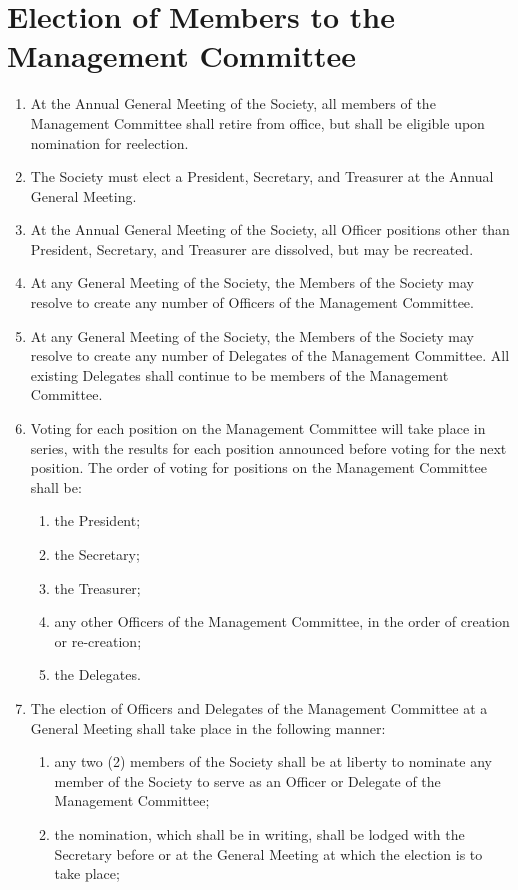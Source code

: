 \documentclass[a4paper]{article}
\begin{document}
\section{Election of Members to the Management Committee}
\begin{enumerate}
\item At the Annual General Meeting of the Society, all members of the Management Committee shall retire from office, but shall be eligible upon nomination for re\textendash election.
\item The Society must elect a President, Secretary, and Treasurer at the Annual General Meeting.
\item At the Annual General Meeting of the Society, all Officer positions other than President, Secretary, and Treasurer are dissolved, but may be re\textendash created.
\item At any General Meeting of the Society, the Members of the Society may resolve to create any number of Officers of the Management Committee.
\item At any General Meeting  of the Society, the Members of the Society may resolve to create any number of Delegates of the Management Committee. All existing Delegates shall continue to be members of the Management Committee.
\item Voting for each position on the Management Committee will take place in series, with the results for each position announced before voting for the next position. The order of voting for positions on the Management Committee shall be:
	\begin{enumerate}
	\item the President;
	\item the Secretary;
	\item the Treasurer;
	\item any other Officers of the Management Committee, in the order of creation or re-creation;
	\item the Delegates.
	\end{enumerate}
\item The election of Officers and Delegates of the Management Committee at a General Meeting shall take place in the following manner:
	\begin{enumerate}
	\item any two (2) members of the Society shall be at liberty to nominate any member of the Society to serve as an Officer or Delegate of the Management Committee;
	\item the nomination, which shall be in writing, shall be lodged with the Secretary before or at the General Meeting at which the election is to take place;

\end{enumerate}
\end{enumerate}
\end{document}
